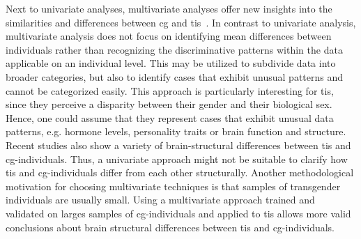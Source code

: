 \documentclass{article}
\begin{document}
    Next to univariate analyses, multivariate analyses offer new insights into the similarities and differences between \ac{cg} and \acp{ti}~\cite{Hoekzema2015, Baldinger-Melich2019}. In contrast to univariate analysis, multivariate analysis does not focus on identifying mean differences between individuals rather than recognizing the discriminative patterns within the data applicable on an individual level. This may be utilized to subdivide data into broader categories, but also to identify cases that exhibit unusual patterns and cannot be categorized easily. This approach is particularly interesting for \acp{ti}, since they perceive a disparity between their gender and their biological sex. Hence, one could assume that they represent cases that exhibit unusual data patterns, e.g. hormone levels, personality traits or brain function and structure. Recent studies also show a variety of brain-structural differences between \acp{ti} and \ac{cg}-individuals. Thus, a univariate approach might not be suitable to clarify how \acp{ti} and \ac{cg}-individuals differ from each other structurally.
    Another methodological motivation for choosing multivariate techniques is that samples of transgender individuals are usually small. Using a multivariate approach trained and validated on larges samples of \ac{cg}-individuals and applied to \acp{ti} allows more valid conclusions about brain structural differences between \acp{ti} and \ac{cg}-individuals.
\end{document}
